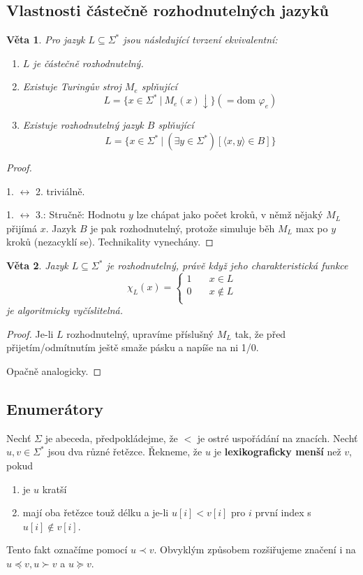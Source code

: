 \documentclass[11pt]{report} %
\newtheorem{theorem}{Věta}[section]
\numberwithin{equation}{section}
\begin{document}
\subsection{Vlastnosti částečně rozhodnutelných jazyků}
\begin{theorem}
Pro jazyk $L \subseteq \Sigma^*$ jsou následující tvrzení ekvivalentní:
\begin{enumerate}
	
	
	\item $L$ je částečně rozhodnutelný.
	\item Existuje Turingův stroj $M_e$ splňující
		$$L = \{x \in \Sigma^*\ |\ M_e(x){\downarrow}\} (= \text{dom } \varphi_e)$$
	\item Existuje rozhodnutelný jazyk $B$ splňující
		$$L = \{x \in \Sigma^*\ |\ (\exists y \in \Sigma^*)[\langle x, y\rangle \in B]\}$$
\end{enumerate}
\end{theorem}
\begin{proof}~
	
1. $\leftrightarrow$ 2. triviálně. 

1. $\leftrightarrow$ 3.: Stručně: Hodnotu $y$ lze chápat jako počet kroků, v němž nějaký $M_L$ přijímá $x$. Jazyk $B$ je pak rozhodnutelný, protože simuluje běh $M_L$ max po $y$ kroků (nezacyklí se). Technikality vynechány.
\end{proof}

\begin{theorem}
Jazyk $L \subseteq \Sigma^*$ je rozhodnutelný, právě když jeho \textit{charakteristická funkce}
$$\chi_L(x) = 
\begin{cases}
1 & \quad x \in L\\
0 & \quad x \notin L\\
\end{cases}
$$
je algoritmicky vyčíslitelná.
\end{theorem}
\begin{proof}
Je-li $L$ rozhodnutelný, upravíme příslušný $M_L$ tak, že před přijetím/odmítnutím ještě smaže pásku a napíše na ni 1/0.

Opačně analogicky.
\end{proof}

\subsection{Enumerátory}
Nechť $\Sigma$ je abeceda, předpokládejme, že $<$ je ostré uspořádání na znacích. Nechť $u, v \in \Sigma^*$ jsou dva různé řetězce. Řekneme, že $u$ je \textbf{lexikograficky menší} než $v$, pokud
\begin{enumerate}
	
	
	\item je $u$ kratší
	\item mají oba řetězce touž délku a je-li $u[i] < v[i]$ pro $i$ první index s $u[i] \notin v[i]$.
	
\end{enumerate}
Tento fakt označíme pomocí $u \prec v$. Obvyklým způsobem rozšiřujeme značení i na $u \preceq v, u \succ v$ a $u \succeq v$.
\end{document}
